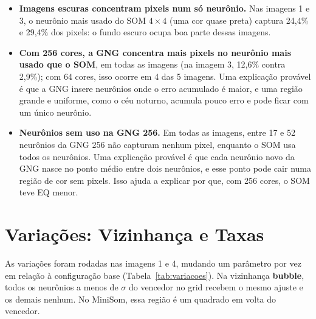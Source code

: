 \documentclass[11pt,a4paper]{article}
\begin{document}
\begin{itemize}
    \item \textbf{Imagens escuras concentram pixels num só neurônio.} Nas imagens 1 e 3, o neurônio mais usado do SOM $4\times4$ (uma cor quase preta) captura 24,4\% e 29,4\% dos pixels: o fundo escuro ocupa boa parte dessas imagens.
    \item \textbf{Com 256 cores, a GNG concentra mais pixels no neurônio mais usado que o SOM}, em todas as imagens (na imagem 3, 12,6\% contra 2,9\%); com 64 cores, isso ocorre em 4 das 5 imagens. Uma explicação provável é que a GNG insere neurônios onde o erro acumulado é maior, e uma região grande e uniforme, como o céu noturno, acumula pouco erro e pode ficar com um único neurônio.
    \item \textbf{Neurônios sem uso na GNG 256.} Em todas as imagens, entre 17 e 52 neurônios da GNG 256 não capturam nenhum pixel, enquanto o SOM usa todos os neurônios. Uma explicação provável é que cada neurônio novo da GNG nasce no ponto médio entre dois neurônios, e esse ponto pode cair numa região de cor sem pixels. Isso ajuda a explicar por que, com 256 cores, o SOM teve EQ menor.
\end{itemize}

\section{Variações: Vizinhança e Taxas}

As variações foram rodadas nas imagens 1 e 4, mudando um parâmetro por vez em relação à configuração base (Tabela~\ref{tab:variacoes}). Na vizinhança \textbf{bubble}, todos os neurônios a menos de $\sigma$ do vencedor no grid recebem o mesmo ajuste e os demais nenhum. No MiniSom, essa região é um quadrado em volta do vencedor.
\end{document}
